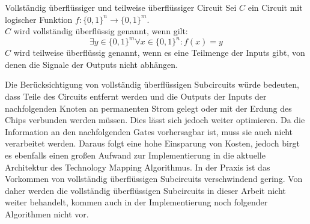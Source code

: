 \documentclass[11pt, a4paper, german]{article}
\newcommand{\TM}{Technology  Mapping }
\begin{document}
 \begin{definition}{Vollständig überflüssiger und teilweise überflüssiger Circuit }
 	Sei $C$ ein Circuit mit logischer Funktion $ f : \{ 0 , 1 \}^n \rightarrow \{ 0 , 1 \}^m $.\\
 	$C$ wird vollständig überflüssig genannt, wenn gilt:
 	\[  \exists y \in \{0,1 \}^m \forall x \in \{ 0, 1\}^n : f(x) = y  \]
 	$C$ wird teilweise überflüssig genannt, wenn es eine Teilmenge der Inputs gibt, von denen die Signale der Outputs nicht abhängen.
 \end{definition}
 
Die Berücksichtigung von vollständig überflüssigen Subcircuits würde bedeuten, dass Teile des Circuits entfernt werden und die Outputs der Inputs der nachfolgenden Knoten an permanenten Strom gelegt oder mit der Erdung des Chips verbunden werden müssen. Dies lässt sich jedoch weiter optimieren. Da die Information an den nachfolgenden Gates vorhersagbar ist, muss sie auch nicht verarbeitet werden. Daraus folgt eine hohe Einsparung von Kosten, jedoch birgt es ebenfalls einen großen Aufwand zur Implementierung in die aktuelle Architektur des \TM Algorithmus. In der Praxis ist das Vorkommen von  vollständig überflüssigen Subcircuits verschwindend gering. Von daher werden die vollständig überflüssigen Subcircuits in dieser Arbeit nicht weiter behandelt, kommen auch in der Implementierung noch folgender Algorithmen nicht vor. \\
 
\end{document}
